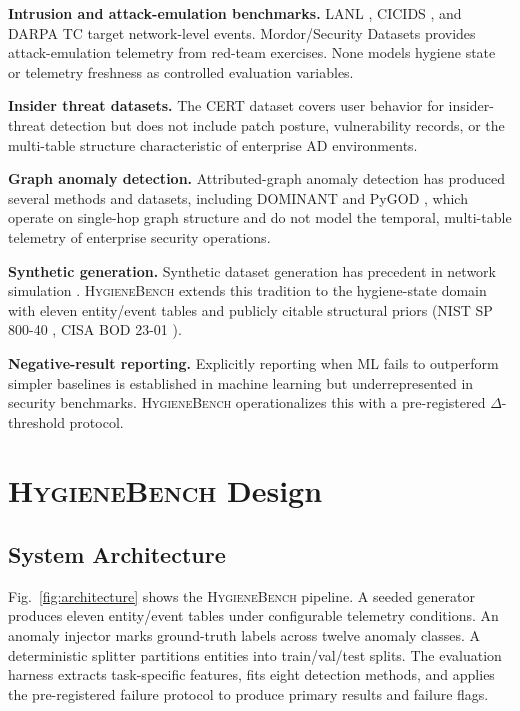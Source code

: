 \documentclass[conference]{IEEEtran}
\newcommand{\hb}{\textsc{HygieneBench}\xspace}
\begin{document}
\textbf{Intrusion and attack-emulation benchmarks.}
LANL \cite{kent2015lanl}, CICIDS \cite{sharafaldin2018cicids}, and DARPA TC
\cite{darpa_tc_2018} target network-level events. Mordor/Security Datasets
\cite{rodriguez2019mordor} provides attack-emulation telemetry from red-team
exercises. None models hygiene state or telemetry freshness as controlled
evaluation variables.

\textbf{Insider threat datasets.}
The CERT dataset \cite{glasser2013cert} covers user behavior for insider-threat
detection but does not include patch posture, vulnerability records, or the
multi-table structure characteristic of enterprise AD environments.

\textbf{Graph anomaly detection.}
Attributed-graph anomaly detection has produced several methods and datasets,
including DOMINANT \cite{ding2019dominant} and PyGOD \cite{liu2024pygod}, which
operate on single-hop graph structure and do not model the temporal, multi-table
telemetry of enterprise security operations.

\textbf{Synthetic generation.}
Synthetic dataset generation has precedent in network simulation
\cite{creech2013kdd}. \hb extends this tradition to the hygiene-state domain with
eleven entity/event tables and publicly citable structural priors (NIST SP
800-40 \cite{nist_sp800_40}, CISA BOD 23-01 \cite{cisa_bod2301_2022}).

\textbf{Negative-result reporting.}
Explicitly reporting when ML fails to outperform simpler baselines is established
in machine learning \cite{sculley2018winners} but underrepresented in security
benchmarks. \hb operationalizes this with a pre-registered
$\Delta$-threshold protocol.

\section{\hb Design}
\label{sec:design}

\subsection{System Architecture}

Fig.~\ref{fig:architecture} shows the \hb pipeline. A seeded generator produces
eleven entity/event tables under configurable telemetry conditions. An anomaly
injector marks ground-truth labels across twelve anomaly classes. A deterministic
splitter partitions entities into train/val/test splits. The evaluation harness
extracts task-specific features, fits eight detection methods, and applies the
pre-registered failure protocol to produce primary results and failure flags.
\end{document}
